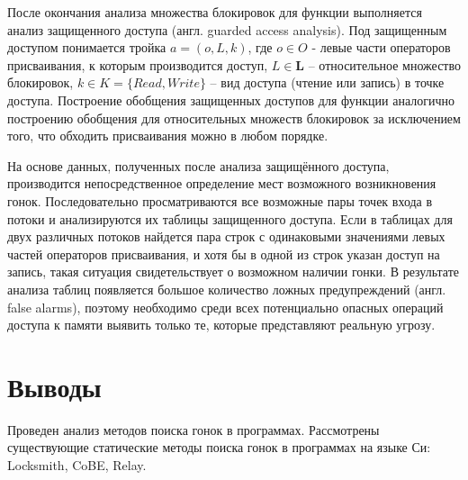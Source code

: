 После окончания анализа множества блокировок для функции выполняется анализ защищенного доступа (англ. guarded access analysis). Под защищенным доступом понимается тройка $a = (o, L, k)$, где $o \in O$ - левые части операторов присваивания, к которым производится доступ, $L \in \mathbf{L}$ – относительное множество блокировок, $k \in K = \{Read, Write\}$ – вид доступа (чтение или запись) в точке доступа. Построение обобщения защищенных доступов для функции аналогично построению обобщения для относительных множеств блокировок за исключением того, что обходить присваивания можно в любом порядке.

На основе данных, полученных после анализа защищённого доступа, производится непосредственное определение мест возможного возникновения гонок. Последовательно просматриваются все возможные пары точек входа в потоки и анализируются их таблицы защищенного доступа. Если в таблицах для двух различных потоков найдется пара строк с одинаковыми значениями левых частей операторов присваивания, и хотя бы в одной из строк указан доступ на запись, такая ситуация свидетельствует о возможном наличии гонки. В результате анализа таблиц появляется большое количество ложных предупреждений (англ. false alarms), поэтому необходимо среди всех потенциально опасных операций доступа к памяти выявить только те, которые представляют реальную угрозу.


\section{Выводы}

Проведен анализ методов поиска гонок в программах. Рассмотрены существующие статические методы поиска гонок в программах на языке Си: Locksmith, CoBE, Relay.
